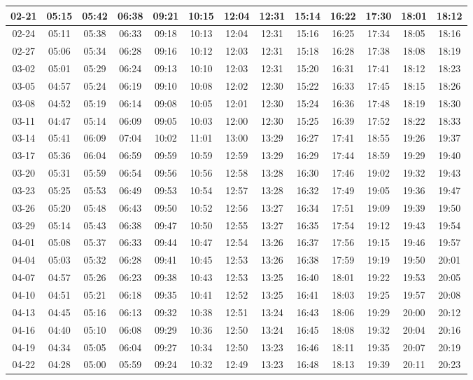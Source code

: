 \begin{footnotesize}
\begin{longtable}{c | c | c | c | c | c | c | c | c | c | c | c | c}
		02-21&05:15&05:42&06:38&09:21&10:15&12:04&12:31&15:14&16:22&17:30&18:01&18:12\\\hline
		02-24&05:11&05:38&06:33&09:18&10:13&12:04&12:31&15:16&16:25&17:34&18:05&18:16\\\hline
		02-27&05:06&05:34&06:28&09:16&10:12&12:03&12:31&15:18&16:28&17:38&18:08&18:19\\\hline
		03-02&05:01&05:29&06:24&09:13&10:10&12:03&12:31&15:20&16:31&17:41&18:12&18:23\\\hline
		03-05&04:57&05:24&06:19&09:10&10:08&12:02&12:30&15:22&16:33&17:45&18:15&18:26\\\hline
		03-08&04:52&05:19&06:14&09:08&10:05&12:01&12:30&15:24&16:36&17:48&18:19&18:30\\\hline
		03-11&04:47&05:14&06:09&09:05&10:03&12:00&12:30&15:25&16:39&17:52&18:22&18:33\\\hline
		03-14&05:41&06:09&07:04&10:02&11:01&13:00&13:29&16:27&17:41&18:55&19:26&19:37\\\hline
		03-17&05:36&06:04&06:59&09:59&10:59&12:59&13:29&16:29&17:44&18:59&19:29&19:40\\\hline
		03-20&05:31&05:59&06:54&09:56&10:56&12:58&13:28&16:30&17:46&19:02&19:32&19:43\\\hline
		03-23&05:25&05:53&06:49&09:53&10:54&12:57&13:28&16:32&17:49&19:05&19:36&19:47\\\hline
		03-26&05:20&05:48&06:43&09:50&10:52&12:56&13:27&16:34&17:51&19:09&19:39&19:50\\\hline
		03-29&05:14&05:43&06:38&09:47&10:50&12:55&13:27&16:35&17:54&19:12&19:43&19:54\\\hline
		04-01&05:08&05:37&06:33&09:44&10:47&12:54&13:26&16:37&17:56&19:15&19:46&19:57\\\hline
		04-04&05:03&05:32&06:28&09:41&10:45&12:53&13:26&16:38&17:59&19:19&19:50&20:01\\\hline
		04-07&04:57&05:26&06:23&09:38&10:43&12:53&13:25&16:40&18:01&19:22&19:53&20:05\\\hline
		04-10&04:51&05:21&06:18&09:35&10:41&12:52&13:25&16:41&18:03&19:25&19:57&20:08\\\hline
		04-13&04:45&05:16&06:13&09:32&10:38&12:51&13:24&16:43&18:06&19:29&20:00&20:12\\\hline
		04-16&04:40&05:10&06:08&09:29&10:36&12:50&13:24&16:45&18:08&19:32&20:04&20:16\\\hline
		04-19&04:34&05:05&06:04&09:27&10:34&12:50&13:23&16:46&18:11&19:35&20:07&20:19\\\hline
		04-22&04:28&05:00&05:59&09:24&10:32&12:49&13:23&16:48&18:13&19:39&20:11&20:23\\\hline

\end{longtable}
\end{footnotesize}
